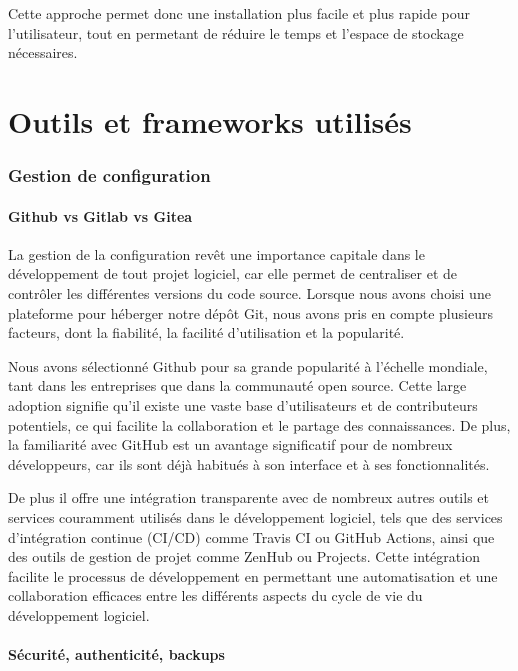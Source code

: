 \documentclass[
	article,			%
	11pt,				%
	oneside,			%
	a4paper,			%
	chapter=TITLE,
	french,			%
	sumario=tradicional
	]{base_nt}
\begin{document}
Cette approche permet donc une installation plus facile et plus rapide pour l'utilisateur, tout en permetant de réduire le temps et l'espace de stockage nécessaires.

\newpage

\part{Outils et frameworks utilisés}

\section{Gestion de configuration}

\subsection{Github vs Gitlab vs Gitea}


La gestion de la configuration revêt une importance capitale dans le développement de tout projet logiciel, car elle permet de centraliser et de contrôler les différentes versions du code source. Lorsque nous avons choisi une plateforme pour héberger notre dépôt Git, nous avons pris en compte plusieurs facteurs, dont la fiabilité, la facilité d'utilisation et la popularité.

Nous avons sélectionné Github pour sa grande popularité à l'échelle mondiale, tant dans les entreprises que dans la communauté open source. Cette large adoption signifie qu'il existe une vaste base d'utilisateurs et de contributeurs potentiels, ce qui facilite la collaboration et le partage des connaissances. De plus, la familiarité avec GitHub est un avantage significatif pour de nombreux développeurs, car ils sont déjà habitués à son interface et à ses fonctionnalités.

De plus il offre une intégration transparente avec de nombreux autres outils et services couramment utilisés dans le développement logiciel, tels que des services d'intégration continue (CI/CD) comme Travis CI ou GitHub Actions, ainsi que des outils de gestion de projet comme ZenHub ou Projects. Cette intégration facilite le processus de développement en permettant une automatisation et une collaboration efficaces entre les différents aspects du cycle de vie du développement logiciel.

\newpage

\subsection{Sécurité, authenticité, backups}
\end{document}
